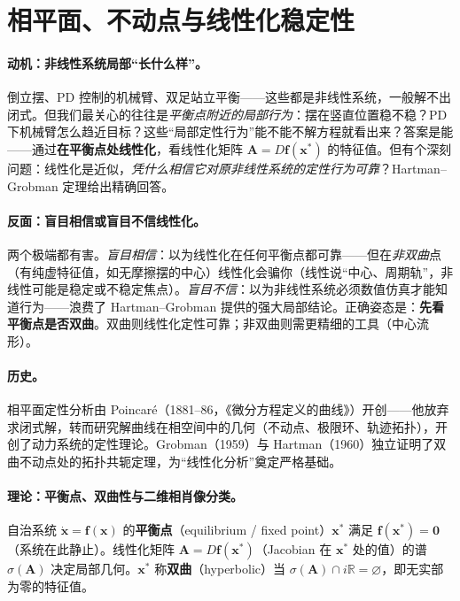 \section{相平面、不动点与线性化稳定性}
\label{sec:ode-phase}

\paragraph{动机：非线性系统局部“长什么样”。}
倒立摆、PD 控制的机械臂、双足站立平衡——这些都是非线性系统，一般解不出闭式。但我们最关心的往往是\emph{平衡点附近的局部行为}：摆在竖直位置稳不稳？PD 下机械臂怎么趋近目标？这些“局部定性行为”能不能不解方程就看出来？答案是能——通过\textbf{在平衡点处线性化}，看线性化矩阵 $\mathbf{A}=D\mathbf{f}(\mathbf{x}^*)$ 的特征值。但有个深刻问题：线性化是近似，\emph{凭什么相信它对原非线性系统的定性行为可靠}？Hartman--Grobman 定理给出精确回答。

\paragraph{反面：盲目相信或盲目不信线性化。}
两个极端都有害。\emph{盲目相信}：以为线性化在任何平衡点都可靠——但在\emph{非双曲}点（有纯虚特征值，如无摩擦摆的中心）线性化会骗你（线性说“中心、周期轨”，非线性可能是稳定或不稳定焦点）。\emph{盲目不信}：以为非线性系统必须数值仿真才能知道行为——浪费了 Hartman--Grobman 提供的强大局部结论。正确姿态是：\textbf{先看平衡点是否双曲}。双曲则线性化定性可靠；非双曲则需更精细的工具（中心流形）。

\paragraph{历史。}
相平面定性分析由 Poincaré（1881--86，《微分方程定义的曲线》）开创——他放弃求闭式解，转而研究解曲线在相空间中的几何（不动点、极限环、轨迹拓扑），开创了动力系统的定性理论。Grobman（1959）与 Hartman（1960）独立证明了双曲不动点处的拓扑共轭定理，为“线性化分析”奠定严格基础\cite{khalil2002nonlinear}。

\paragraph{理论：平衡点、双曲性与二维相肖像分类。}

\begin{definition}[平衡点与双曲性]\label{def:equilibrium}
自治系统 $\dot{\mathbf{x}}=\mathbf{f}(\mathbf{x})$ 的\textbf{平衡点}（equilibrium / fixed point）$\mathbf{x}^*$ 满足 $\mathbf{f}(\mathbf{x}^*)=\mathbf{0}$（系统在此静止）。线性化矩阵 $\mathbf{A}=D\mathbf{f}(\mathbf{x}^*)$（Jacobian 在 $\mathbf{x}^*$ 处的值）的谱 $\sigma(\mathbf{A})$ 决定局部几何。$\mathbf{x}^*$ 称\textbf{双曲}（hyperbolic）当 $\sigma(\mathbf{A})\cap i\mathbb{R}=\varnothing$，即无实部为零的特征值。
\end{definition}


